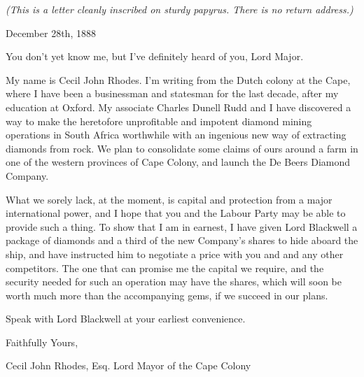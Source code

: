 \documentclass[white]{airship}
\begin{document}
\name{\wDeBeersLabour{}} %
{\em (This is a letter cleanly inscribed on sturdy papyrus. There is no return address.)}

December 28th, 1888

You don't yet know me, but I've definitely heard of you, Lord Major.

My name is Cecil John Rhodes. I'm writing from the Dutch colony at the Cape, where I have been a businessman and statesman for the last decade, after my education at Oxford. My associate Charles Dunell Rudd and I have discovered a way to make the heretofore unprofitable and impotent diamond mining operations in South Africa worthwhile with an ingenious new way of extracting diamonds from rock. We plan to consolidate some claims of ours around a farm in one of the western provinces of Cape Colony, and launch the De Beers Diamond Company.

What we sorely lack, at the moment, is capital and protection from a major international power, and I hope that you and the Labour Party may be able to provide such a thing. To show that I am in earnest, I have given Lord Blackwell a package of diamonds and a third of the new Company's shares to hide aboard the ship, and have instructed him to negotiate a price with you and and any other competitors. The one that can promise me the capital we require, and the security needed for such an operation may have the shares, which will soon be worth much more than the accompanying gems, if we succeed in our plans.

Speak with Lord Blackwell at your earliest convenience.

Faithfully Yours, 

Cecil John Rhodes, Esq.
Lord Mayor of the Cape Colony
\end{document}
